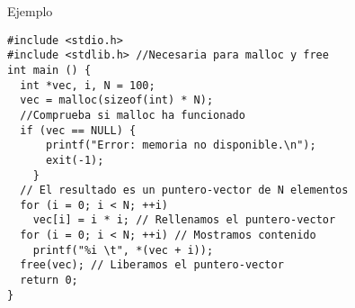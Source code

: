 \documentclass[xcolor={usenames,svgnames,dvipsnames}, aspectratio=169]{beamer}
\begin{document}
\begin{frame}[label={sec:org5ed60f1},fragile,plain]{Ejemplo}
 \lstset{language=C,label= ,caption= ,captionpos=b,numbers=none}
\begin{lstlisting}
#include <stdio.h>
#include <stdlib.h> //Necesaria para malloc y free
int main () {
  int *vec, i, N = 100;
  vec = malloc(sizeof(int) * N);
  //Comprueba si malloc ha funcionado
  if (vec == NULL) {
      printf("Error: memoria no disponible.\n");
      exit(-1);
    }
  // El resultado es un puntero-vector de N elementos
  for (i = 0; i < N; ++i) 
    vec[i] = i * i; // Rellenamos el puntero-vector
  for (i = 0; i < N; ++i) // Mostramos contenido
    printf("%i \t", *(vec + i));
  free(vec); // Liberamos el puntero-vector
  return 0;
}
\end{lstlisting}
\end{frame}
\end{document}
